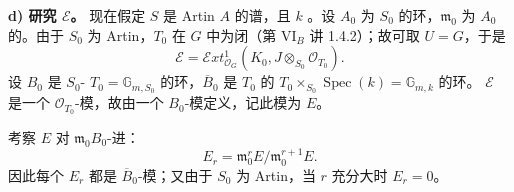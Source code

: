 \textbf{d) 研究 $\mathcal E$。}
现在假定 $S$ 是 Artin  $A$ 的谱，且 $k$ 。设 $A_0$ 为 $S_0$ 的环，$\mathfrak m_0$ 为 $A_0$ 的。由于 $S_0$ 为 Artin，$T_0$ 在 $G$ 中为闭（第 VI$_B$ 讲 1.4.2）；故可取 $U=G$，于是
\[\mathcal E=\mathscr Ext^1_{\mathcal O_G}(K_0,J\otimes_{S_0}\mathcal O_{T_0}).\]
设 $B_0$ 是 $S_0$- $T_0=\mathbb G_{m,S_0}$ 的环，$\overline B_0$ 是 $T_0$ 的 $T_0\times_{S_0}\operatorname{Spec}(k)=\mathbb G_{m,k}$ 的环。 $\mathcal E$ 是一个 $\mathcal O_{T_0}$-模，故由一个 $B_0$-模定义，记此模为 $E$。

考察 $E$ 对 $\mathfrak m_0B_0$-进：
\[E_r=\mathfrak m_0^rE/\mathfrak m_0^{r+1}E.\]
因此每个 $E_r$ 都是 $\overline B_0$-模；又由于 $S_0$ 为 Artin，当 $r$ 充分大时 $E_r=0$。

